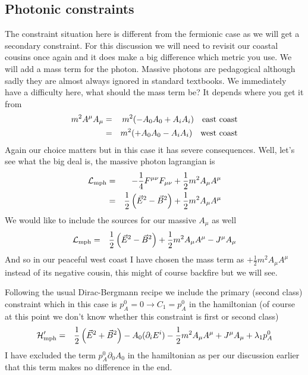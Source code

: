 \documentclass[aps,preprint,preprintnumbers,nofootinbib,showpacs,prd]{revtex4-1}
\newcommand{\nbea}{\begin{eqnarray*}}
\newcommand{\neea}{\end{eqnarray*}}
\begin{document}
\subsection{Photonic constraints}

The constraint situation here is different from the fermionic case as we will get a secondary constraint. For this discussion we will need to revisit our coastal cousins once again and it does make a big difference which metric you use. We will add a mass term for the photon. Massive photons are pedagogical although sadly they are almost always ignored in standard textbooks. We immediately have a difficulty here, what  should the mass term be? It depends where you get it from
%
\nbea
m^2 A^\mu A_\mu & = & m^2 (-A_0 A_0 + A_i A_i) ~~~ {\rm east~coast} \\
& = & m^2 (+A_0 A_0 - A_i A_i) ~~~ {\rm west~coast}
\neea
%
Again our choice matters but in this case it has severe consequences. Well, let's see what the big deal is, the massive photon lagrangian is
%
\nbea
\mathcal{L}_{\rm mph} & = & -\frac{1}{4} F^{\mu\nu}F_{\mu\nu} + \frac{1}{2} m^2 A_\mu A^\mu\\
& = & \frac{1}{2}  \left ( \vec E^2 - \vec B^2 \right ) + \frac{1}{2} m^2 A_\mu A^\mu
\neea
%
We would like to include the sources for our massive $A_\mu$ as well
%
\nbea
\mathcal{L}_{\rm mph} & = & \frac{1}{2}  \left ( \vec E^2 - \vec B^2 \right ) + \frac{1}{2} m^2 A_\mu A^\mu - J^\mu A_\mu
\neea
%
And so in our peaceful west coast I have chosen the mass term as $+\frac{1}{2} m^2 A_\mu A^\mu$ instead of its negative cousin, this might of course backfire but we will see.

Following the usual Dirac-Bergmann recipe we include the primary (second class) constraint which in this case is $p^0_A = 0 \to C_1 = p^0_A$ in the hamiltonian (of course at this point we don't know whether this constraint is first or second class)
%
\nbea
\mathcal{H}'_{\rm mph} & = & \frac{1}{2} \left ( \vec E^2 + \vec B^2 \right ) - A_0 (\partial_i E^{i}) - \frac{1}{2} m^2 A_\mu A^\mu + J^\mu A_\mu + \lambda_1 p^0_A
\neea
%
I have excluded the term $p^0_A \partial_0 A_0$ in the hamiltonian as per our discussion earlier that this term makes no difference in the end.
\end{document}
